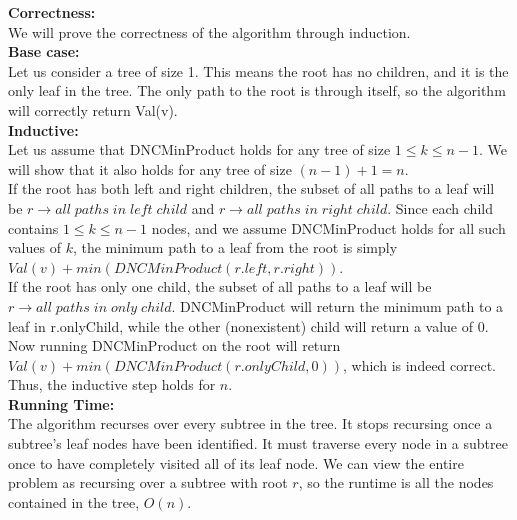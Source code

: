 \documentclass[answers]{exam}
\begin{document}
\begin{questions}
\begin{algorithm}
	\DontPrintSemicolon
\end{algorithm}

{\bf Correctness:}\\
We will prove the correctness of the algorithm through induction.\\

{\bf Base case:}\\
Let us consider a tree of size 1. This means the root has no children, and it is the only leaf in the tree. The only path to the root is through itself, so the algorithm will correctly return Val(v).\\

{\bf Inductive:}\\
Let us assume that DNCMinProduct holds for any tree of size $1 \leq k \leq n - 1$. We will show that it also holds for any tree of size $(n - 1) + 1 = n$.\\

If the root has both left and right children, the subset of all paths to a leaf will be $r \rightarrow all\;paths\;in\;left\;child$ and $r \rightarrow all\;paths\;in\;right\;child$. Since each child contains $1 \leq k \leq n - 1$ nodes, and we assume DNCMinProduct holds for all such values of $k$, the minimum path to a leaf from the root is simply $Val(v) + min(DNCMinProduct(r.left, r.right))$.\\

If the root has only one child, the subset of all paths to a leaf will be $r \rightarrow all\;paths\;in\;only\;child$. DNCMinProduct will return the minimum path to a leaf in r.onlyChild, while the other (nonexistent) child will return a value of 0. Now running DNCMinProduct on the root will return $Val(v) + min(DNCMinProduct(r.onlyChild, 0))$, which is indeed correct. Thus, the inductive step holds for $n$.\\


{\bf Running Time:}\\
The algorithm recurses over every subtree in the tree. It stops recursing once a subtree's leaf nodes have been identified. It must traverse every node in a subtree once to have completely visited all of its leaf node. We can view the entire problem as recursing over a subtree with root $r$, so the runtime is all the nodes contained in the tree, $O(n)$.


\end{questions}
\end{document}
